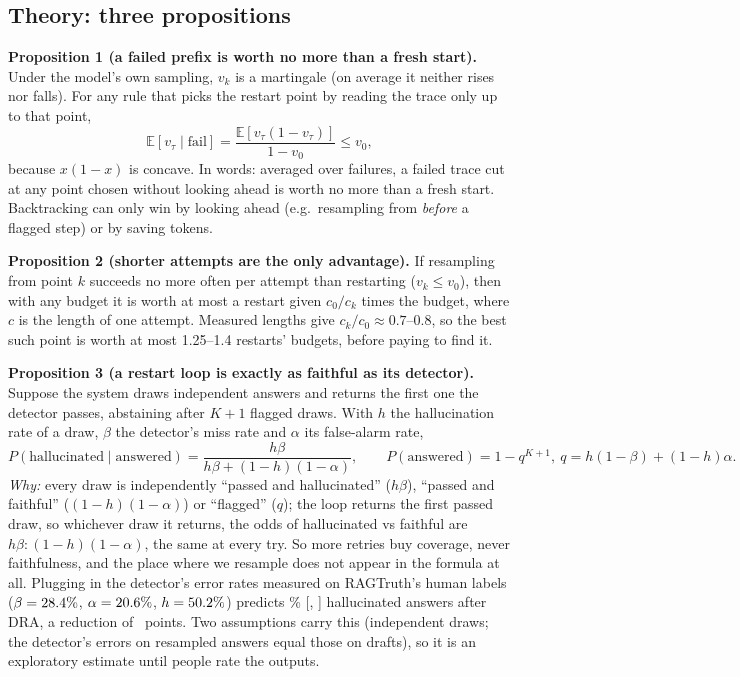 \documentclass[11pt,a4paper]{article}
\begin{document}
\subsection{Theory: three propositions}
\textbf{Proposition 1 (a failed prefix is worth no more than a fresh start).}
Under the model's own sampling, $v_k$ is a martingale (on average it neither rises nor falls). For
any rule that picks the restart point by reading the trace only up to that point,
\[ \mathbb{E}[v_\tau \mid \text{fail}] = \frac{\mathbb{E}[v_\tau(1-v_\tau)]}{1-v_0} \le v_0 , \]
because $x(1-x)$ is concave. In words: averaged over failures, a failed trace cut at any point
chosen without looking ahead is worth no more than a fresh start. Backtracking can only win by
looking ahead (e.g.\ resampling from \emph{before} a flagged step) or by saving tokens.

\textbf{Proposition 2 (shorter attempts are the only advantage).} If resampling from point $k$
succeeds no more often per attempt than restarting ($v_k\le v_0$), then with any budget it is worth at
most a restart given $c_0/c_k$ times the budget, where $c$ is the length of one attempt. Measured
lengths give $c_k/c_0\approx0.7$--$0.8$, so the best such point is worth at most 1.25--1.4 restarts'
budgets, before paying to find it.

\textbf{Proposition 3 (a restart loop is exactly as faithful as its detector).} Suppose the system
draws independent answers and returns the first one the detector passes, abstaining after $K+1$
flagged draws. With $h$ the hallucination rate of a draw, $\beta$ the detector's miss rate and
$\alpha$ its false-alarm rate,
\[ P(\text{hallucinated}\mid\text{answered}) = \frac{h\beta}{h\beta+(1-h)(1-\alpha)}, \qquad
P(\text{answered}) = 1-q^{K+1},\ q = h(1-\beta)+(1-h)\alpha . \]
\emph{Why:} every draw is independently ``passed and hallucinated'' ($h\beta$), ``passed and faithful''
($(1-h)(1-\alpha)$) or ``flagged'' ($q$); the loop returns the first passed draw, so whichever draw it
returns, the odds of hallucinated vs faithful are $h\beta : (1-h)(1-\alpha)$, the same at every try. So
more retries buy coverage, never faithfulness, and the place where we resample does not appear in
the formula at all. Plugging in the detector's error rates measured on RAGTruth's human labels
($\beta=28.4\%$, $\alpha=20.6\%$, $h=50.2\%$) predicts \lawPi\% [\lawPiLo, \lawPiHi]
hallucinated answers after DRA, a reduction of \lawRed\ points. Two assumptions carry this
(independent draws; the detector's errors on resampled answers equal those on drafts), so it is an
exploratory estimate until people rate the outputs.
\end{document}
